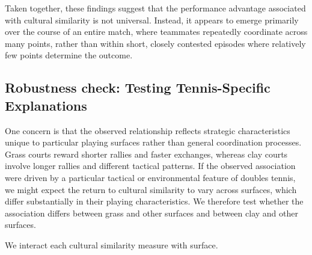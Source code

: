 \documentclass[10pt]{article}
\begin{document}
Taken together, these findings suggest that the performance advantage associated with cultural similarity is not universal. Instead, it appears to emerge primarily over the course of an entire match, where teammates repeatedly coordinate across many points, rather than within short, closely contested episodes where relatively few points determine the outcome.



\subsection{Robustness check: Testing Tennis-Specific Explanations} 


One concern is that the observed relationship reflects strategic characteristics unique to particular playing surfaces rather than general coordination processes. Grass courts reward shorter rallies and faster exchanges, whereas clay courts involve longer rallies and different tactical patterns. 
If the observed association were driven by a particular tactical or environmental feature of doubles tennis, we might expect the return to cultural similarity to vary across surfaces, which differ substantially in their playing characteristics. We therefore test whether the association differs between grass and other surfaces and between clay and other surfaces.


We interact each cultural similarity measure with surface.
\end{document}
